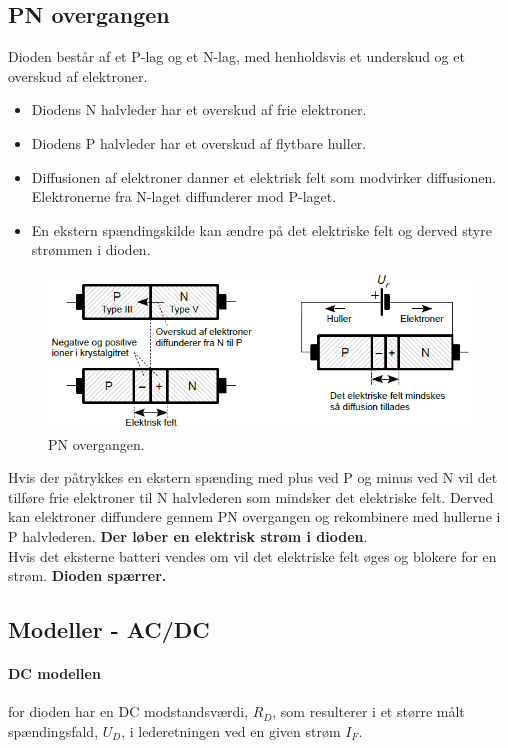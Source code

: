 \documentclass[danish]{article}
\begin{document}
\subsection{PN overgangen}
Dioden består af et P-lag og et N-lag, med henholdsvis et underskud og et overskud af elektroner.
\begin{itemize}
	\item Diodens N halvleder har et overskud af frie elektroner.
	\item Diodens P halvleder har et overskud af flytbare huller. 
	\item Diffusionen af elektroner danner et elektrisk felt som modvirker diffusionen. Elektronerne fra N-laget diffunderer mod P-laget.
	\item En ekstern spændingskilde kan ændre på det elektriske felt og derved styre strømmen i dioden.
\end{itemize}

\begin{figure} [H]
	\centering
	\includegraphics[width=\linewidth]{graphics/PN_overgang}
	\caption{PN overgangen.}
	\label{fig:pnovergang}
\end{figure}

Hvis der påtrykkes en ekstern spænding med plus ved P og minus ved N vil det tilføre frie elektroner til N halvlederen som mindsker det elektriske felt.
Derved kan elektroner diffundere gennem PN overgangen og rekombinere med hullerne i P halvlederen. \textbf{Der løber en elektrisk strøm i dioden}. \\

Hvis det eksterne batteri vendes om vil det elektriske felt øges og blokere for en strøm. \textbf{Dioden spærrer.}


\subsection{Modeller - AC/DC}
\paragraph{DC modellen} for dioden har en DC modstandsværdi, $R_D$, som resulterer i et større målt spændingsfald, $U_D$, i lederetningen ved en given strøm $I_F$.
\end{document}
